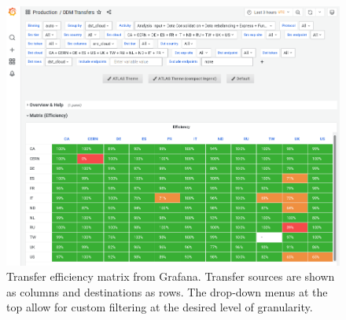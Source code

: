 \begin{landscape}
\begin{figure}
    \centering
    \includegraphics[height=\textwidth]{figures/220_introduction/grafana_efficiency_matrix_narrow1.png}
    \caption{Transfer efficiency matrix from Grafana. Transfer sources are shown as columns and destinations as rows. The drop-down menus at the top allow for custom filtering at the desired level of granularity.}
    \label{fig:efficiency_matrix}
\end{figure}
\end{landscape}
